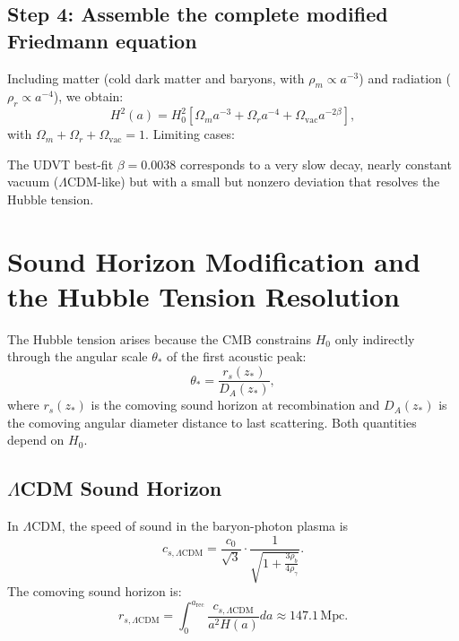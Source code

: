 \documentclass[12pt,a4paper]{book}
\theoremstyle{definition}
\theoremstyle{remark}
\begin{document}
\subsection{Step 4: Assemble the complete modified Friedmann equation}

Including matter (cold dark matter and baryons, with $\rho_m \propto a^{-3}$) and radiation ($\rho_r \propto a^{-4}$), we obtain:
\begin{equation}
    H^2(a) = H_0^2 \left[ \Omega_m a^{-3} + \Omega_r a^{-4} + \Omega_{\mathrm{vac}} a^{-2\beta} \right],
\end{equation}
with $\Omega_m + \Omega_r + \Omega_{\mathrm{vac}} = 1$. Limiting cases:
The UDVT best-fit $\beta = 0.0038$ corresponds to a very slow decay, nearly constant vacuum ($\Lambda$CDM-like) but with a small but nonzero deviation that resolves the Hubble tension.

\section{Sound Horizon Modification and the Hubble Tension Resolution}

The Hubble tension arises because the CMB constrains $H_0$ only indirectly through the angular scale $\theta_*$ of the first acoustic peak:
\begin{equation}
    \theta_* = \frac{r_s(z_*)}{D_A(z_*)},
\end{equation}
where $r_s(z_*)$ is the comoving sound horizon at recombination and $D_A(z_*)$ is the comoving angular diameter distance to last scattering. Both quantities depend on $H_0$.

\subsection{$\Lambda$CDM Sound Horizon}

In $\Lambda$CDM, the speed of sound in the baryon-photon plasma is
\begin{equation}
    c_{s,\Lambda\mathrm{CDM}} = \frac{c_0}{\sqrt{3}} \cdot \frac{1}{\sqrt{1 + \frac{3\rho_b}{4\rho_\gamma}}}.
\end{equation}
The comoving sound horizon is:
\begin{equation}
    r_{s,\Lambda\mathrm{CDM}} = \int_0^{a_{\mathrm{rec}}} \frac{c_{s,\Lambda\mathrm{CDM}}}{a^2 H(a)} da \approx 147.1 \, \text{Mpc}.
\end{equation}
\end{document}
